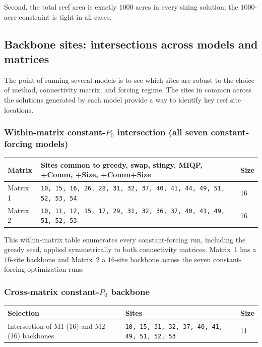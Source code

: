 \documentclass[11pt]{article}
\begin{document}
Second, the total reef area is exactly $1000$ acres in every sizing solution; the $1000$-acre constraint is tight in all cases.

\subsection{Backbone sites: intersections across models and matrices}
\label{sec:backbone}

The point of running several models is to see which sites are robust to the choice of method, connectivity matrix, and forcing regime. The sites in common across the solutions generated by each model provide a way to identify key reef site locations.

\subsubsection*{Within-matrix constant-$P_0$ intersection (all seven constant-forcing models)}

\begin{table}[H]
\centering
\small
\begin{tabular}{@{}lll@{}}
\toprule
\textbf{Matrix} & \textbf{Sites common to greedy, swap, stingy, MIQP, +Comm, +Size, +Comm+Size} & \textbf{Size} \\
\midrule
Matrix 1 & \texttt{10, 15, 16, 26, 28, 31, 32, 37, 40, 41, 44, 49, 51, 52, 53, 54} & 16 \\
Matrix 2 & \texttt{10, 11, 12, 15, 17, 29, 31, 32, 36, 37, 40, 41, 49, 51, 52, 53} & 16 \\
\bottomrule
\end{tabular}
\end{table}

This within-matrix table enumerates every constant-forcing run, including the greedy seed, applied symmetrically to both connectivity matrices. Matrix~1 has a $16$-site backbone and Matrix~2 a $16$-site backbone across the seven constant-forcing optimization runs.

\subsubsection*{Cross-matrix constant-$P_0$ backbone}

\begin{table}[H]
\centering
\small
\begin{tabular}{@{}lll@{}}
\toprule
\textbf{Selection} & \textbf{Sites} & \textbf{Size} \\
\midrule
Intersection of M1 (16) and M2 (16) backbones & \texttt{10, 15, 31, 32, 37, 40, 41, 49, 51, 52, 53} & 11 \\
\bottomrule
\end{tabular}
\end{table}
\end{document}
